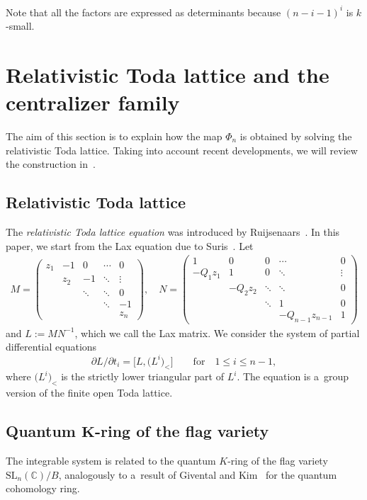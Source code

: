 \documentclass[10pt,a4paper]{amsart}
\numberwithin{equation}{section}
\newcommand{\C}{\mathbb{C}}
\newcommand{\SL}{\mathrm{SL}}
\theoremstyle{definition}
\begin{document}
Note that all the factors 
are expressed as determinants because $(n-i-1)^i$ is $k$-small.


\section{Relativistic Toda lattice and the centralizer family}\label{sec:RTL}
The aim of this section is to explain how the map $\Phi_n$ is
obtained by solving the relativistic Toda lattice.
Taking into account
recent developments,
we will review the construction in~\cite{IIM}.



\subsection{Relativistic Toda lattice}\label{sec:Rel Toda}
The \emph{relativistic Toda lattice equation}
was introduced by Ruijsenaars~\cite{Rui}.
In this paper, we start from the Lax equation due to Suris~\cite{Suris}.
Let
\begin{align}\label{eq:def_of_M_and_Q}
M=\begin{pmatrix}
z_1 & -1 & 0 & \cdots &0\\
 & z_2 & -1 & \ddots &\vdots\\
 & & \ddots & \ddots & 0\\
 & & &\ddots & -1\\
 & & & & z_n
\end{pmatrix},\quad
N=\begin{pmatrix}
1 & 0 & 0 & \cdots &0\\
-Q_1z_1 & 1 & 0 & \ddots &\vdots\\
 & -Q_2z_2 & \ddots & \ddots & 0\\
 & & \ddots&1& 0\\
 & & &-Q_{n-1}z_{n-1} & 1
\end{pmatrix}
\end{align}
and $L:=MN^{-1}$, which we call the Lax matrix.
We consider the system of partial differential equations
\begin{equation}\label{eq:rel_Toda}
{\partial L}/{\partial t_i}=\big[L,\bigl(L^i\bigr)_{<}\big]\qquad\text{for}\quad 1\le i\le n-1,
\end{equation}
where $\bigl(L^i\bigr)_{<}$ is the
strictly lower triangular part of $L^i$.
The equation is a~group version of the finite open Toda lattice.



\subsection[Quantum K-ring of the flag variety]{Quantum $\boldsymbol{K}$-ring of the flag variety}\label{sec:QK}
The integrable system is related to the quantum
$K$-ring of the flag variety $\SL_n(\C)/B$, analogously to a~result of
Givental and Kim~\cite{GK} for the quantum cohomology ring.
\end{document}
